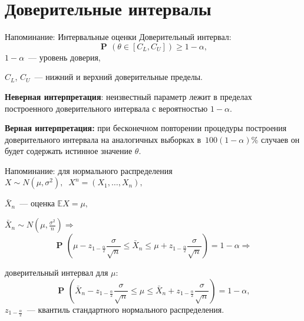 \documentclass[9pt,pdf,utf8,hyperref={unicode},aspectratio=169]{beamer}
\DeclareMathOperator{\prob}{\mathbf{P}\!}
\renewcommand{\leq}{\leqslant}
\renewcommand{\geq}{\geqslant}
\begin{document}
\section{Доверительные интервалы}
\begin{frame}{Напоминание: Интервальные оценки}
% 
    Доверительный интервал:
    $$\prob\left(\theta \in \left[C_L, C_U\right]\right)\geq 1-\alpha,$$
    $1-\alpha$~--- уровень доверия, 
    
    $C_L$, $C_U$~--- нижний и верхний доверительные пределы.

    \bigskip

	\textbf{Неверная интерпретация}: неизвестный параметр лежит в пределах построенного доверительного интервала с вероятностью $1-\alpha$.
	
	\bigskip

	\textbf{Верная интерпретация:} при бесконечном повторении процедуры построения доверительного интервала на аналогичных выборках в~$100(1-\alpha)$\% случаев он будет содержать истинное значение $\theta$.
\end{frame}

\begin{frame}{Напоминание: для нормального распределения}
	$X\sim N\left(\mu,\sigma^2\right),\;\; X^n=\left(X_1,\dots,X_n\right),$
	
	\bigskip
	
	$\bar{X}_n$~--- оценка $\mathbb{E}X=\mu,$
	\bigskip
	
    $\bar{X}_n\sim N\left(\mu, \frac{\sigma^2}{n}\right) \Rightarrow $
	$$\prob \left(\mu-z_{1-\frac{\alpha}{2}} \frac{\sigma}{\sqrt{n}}  \leq \bar{X}_n \leq \mu +z_{1-\frac{\alpha}{2}} \frac{\sigma}{\sqrt{n}} \right)=1-\alpha \Rightarrow $$
	
	доверительный интервал для $\mu$:
	$$\prob \left(\bar{X}_n-z_{1-\frac{\alpha}{2}} \frac{\sigma}{\sqrt{n}}  \leq \mu \leq \bar{X}_n +z_{1-\frac{\alpha}{2}} \frac{\sigma}{\sqrt{n}} \right)=1-\alpha,$$
	$z_{1-\frac{\alpha}{2}}$~--- квантиль стандартного нормального распределения.
\end{frame}
\end{document}
